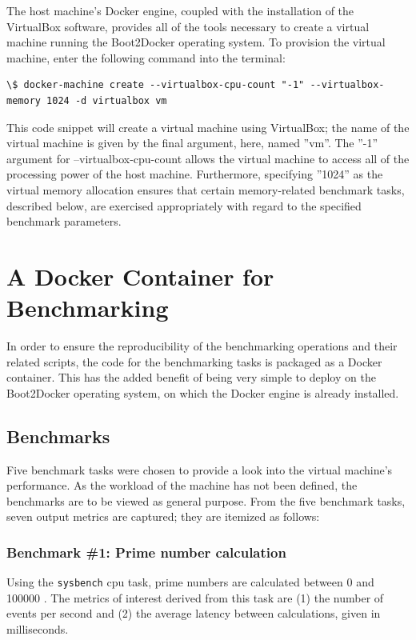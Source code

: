 \documentclass[sigconf]{acmart}
\begin{document}
The host machine's Docker engine, coupled with the installation of the VirtualBox software, provides all of the tools necessary to create a virtual machine running the Boot2Docker operating system. To provision the virtual machine, enter the following command into the terminal:

\begin{lstlisting}
\$ docker-machine create --virtualbox-cpu-count "-1" --virtualbox-memory 1024 -d virtualbox vm
\end{lstlisting}



This code snippet will create a virtual machine using VirtualBox; the name of the virtual machine is given by the final argument, here, named ''vm''. The ''-1'' argument for --virtualbox-cpu-count allows the virtual machine to access all of the processing power of the host machine. Furthermore, specifying ''1024'' as the virtual memory allocation ensures that certain memory-related benchmark tasks, described below, are exercised appropriately with regard to the specified benchmark parameters.

\section{A Docker Container for Benchmarking}

In order to ensure the reproducibility of the benchmarking operations and their related scripts, the code for the benchmarking tasks is packaged as a Docker container. This has the added benefit of being very simple to deploy on the Boot2Docker operating system, on which the Docker engine is already installed.

\subsection{Benchmarks}

Five benchmark tasks were chosen to provide a look into the virtual machine's performance. As the workload of the machine has not been defined, the benchmarks are to be viewed as general purpose. From the five benchmark tasks, seven output metrics are captured; they are itemized as follows:

\subsubsection{Benchmark \#1: Prime number calculation}

Using the {\tt sysbench} cpu task, prime numbers are calculated between 0 and 100000 \cite{sysbench}. The metrics of interest derived from this task are (1) the number of events per second and (2) the average latency between calculations, given in milliseconds.
\end{document}
